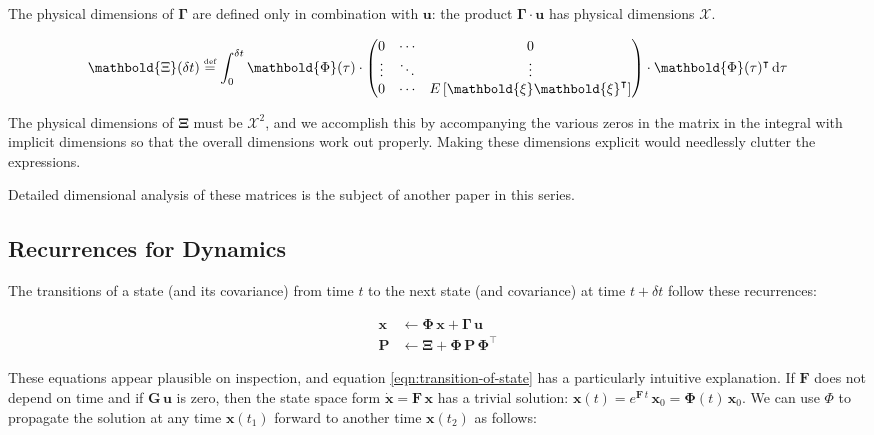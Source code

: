 \documentclass[10pt,oneside,x11names]{article}
\begin{document}
\noindent The physical dimensions of \(\mathbold{\Gamma}\) are defined only in
combination with \(\mathbold{u}\): the product \(\mathbold{\Gamma}\cdot\mathbold{u}\)
has physical dimensions \(\mathcal{X}\).

\begin{equation}
\label{eqn:definition-of-Xi}
\mathbold{\Xi}(\delta t)\stackrel{\text{\tiny def}}{=}
\int_{0}^{\delta t}\mathbold{\Phi}(\tau)\cdot{
\begin{pmatrix}
      0 & \cdots  &       0 \\
\vdots  & \ddots  & \vdots  \\ 
      0 & \cdots  & E\left[\mathbold{ \xi  }\mathbold{ \xi  }^{ \intercal  }\right] 
\end{pmatrix}\cdot\mathbold{\Phi}(\tau)^\intercal\,\textrm{d}\tau}
\end{equation}

\noindent The physical dimensions of \(\mathbold{\Xi}\) must be \(\mathcal{X}^2\), and we
accomplish this by accompanying the various zeros in the matrix in the integral
with implicit dimensions so that the overall dimensions work out properly.
Making these dimensions explicit would needlessly clutter the expressions.

Detailed dimensional analysis of these matrices is the subject of another paper
in this series.

\subsection{Recurrences for Dynamics}
\label{sec:orgheadline4}

The transitions of a state (and its covariance) from time \(t\) to the next state
(and covariance) at time
\(t+\delta t\) follow these recurrences:

\begin{align}
\label{eqn:transition-of-state}
\mathbold{x}
&\leftarrow
\mathbold{\Phi}\,
\mathbold{x}+
\mathbold{\Gamma}\,
\mathbold{u} \\
\mathbold{P}
&\leftarrow
\mathbold{\Xi}+
\mathbold{\Phi}\,
\mathbold{P}\,
\mathbold{\Phi}^\intercal
\end{align}

These equations appear plausible on inspection, and equation
\ref{eqn:transition-of-state} has a particularly intuitive explanation. If
\(\mathbold{F}\) does not depend on time and if \(\mathbold{G}\,\mathbold{u}\) is
zero, then the state space form \(\dot{\mathbold{x}}=\mathbold{F}\,\mathbold{x}\)
has a trivial solution:
\(\mathbold{x}(t)=e^{\mathbold{F}\,t}\,\mathbold{x}_0=\mathbold{\Phi}(t)\,\mathbold{x}_0\). We can use \(\Phi\) to
propagate the solution at any time \(\mathbold{x}(t_1)\) forward to another time
\(\mathbold{x}(t_2)\) as follows:
\end{document}
